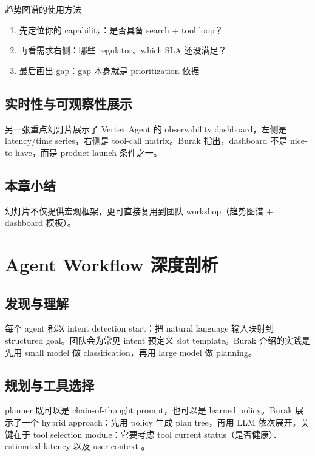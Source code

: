 \documentclass[a4paper]{article}
\begin{document}
\begin{knowledgebox}{趋势图谱的使用方法}
\begin{enumerate}
    \item 先定位你的 capability：是否具备 search + tool loop？
    \item 再看需求右侧：哪些 regulator、which SLA 还没满足？
    \item 最后画出 gap：gap 本身就是 prioritization 依据
\end{enumerate}
\end{knowledgebox}

\subsection{实时性与可观察性展示}

另一张重点幻灯片展示了 Vertex Agent 的 observability dashboard，左侧是 latency/time series，右侧是 tool-call matrix。Burak 指出，dashboard 不是 nice-to-have，而是 product launch 条件之一。

\subsection{本章小结}

幻灯片不仅提供宏观框架，更可直接复用到团队 workshop（趋势图谱 + dashboard 模板）。

\section{Agent Workflow 深度剖析}

\subsection{发现与理解}

每个 agent 都以 intent detection start：把 natural language 输入映射到 structured goal。团队会为常见 intent 预定义 slot template。Burak 介绍的实践是先用 small model 做 classification，再用 large model 做 planning。

\subsection{规划与工具选择}

planner 既可以是 chain-of-thought prompt，也可以是 learned policy。Burak 展示了一个 hybrid approach：先用 policy 生成 plan tree，再用 LLM 依次展开。关键在于 tool selection module：它要考虑 tool current status（是否健康）、estimated latency 以及 user context 。
\end{document}
